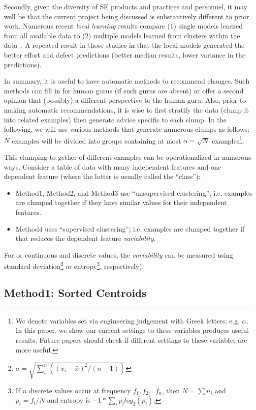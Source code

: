 \documentclass{sig-alternate}
\newcommand{\bi}{\begin{itemize}}
\newcommand{\ei}{\end{itemize}}
\begin{document}
Secondly, given the diversity of SE products and practices
and personnel, it may well be that the current project being discussed is 
substantively different to prior work. 
Numerous recent {\em local learning} results compare (1) single models
learned from all available data to (2) multiple models learned from clusters within the data~\cite{betten14,yang11,yang13,minku13,me12d,me11m,posnett11}.
A repeated result in those studies in that the local models generated the better effort
and defect predictions (better median results,
lower variance in the predictions).

In summary, 
it is useful to have automatic methods to recommend changes. Such
methods can fill in for human gurus (if such gurus are absent) or 
offer a second opinion that (possibly)  a different perspective to the human guru.
Also, prior to making automatic recommendations, it is wise to first stratify the data
(clump it into related examples) then generate advice specific to each clump.
In the following, we will use various methods that generate numerous clumps as follows:
  $N$ examples will be divided into groups containing at most $\alpha=\sqrt{N}$
  examples\footnote{We denote variables
  set via  engineering judgement  with Greek letters; e.g. $\alpha$.
  In this paper, we show our current settings to these variables produces useful
  results.  Future papers should check if different
  settings to these variables are more useful.}.
 
 This clumping to gether of different examples  can be operationalized in numerous ways. Consider  a table of data
with many independent features and one dependent feature (where the latter is usually called
the ``class''):
\bi
\item
Method1, Method2, and Method3
use ``unsupervised clustering''; i.e. examples are clumped together if they have
similar values for their independent features. 
\item
Method4 uses ``supervised clustering'';
i.e. examples are clumped together if that  reduces the dependent feature {\em variability}.
\ei
For or continuous and discrete values,
the {\em variability} can be measured using standard deviation\footnote{$\sigma = \sqrt{\sum^n_i \left( (x_i - \bar{x})^2/(n-1)\right)}$} or entropy\footnote{If $n$ discrete values occur at frequency
$f_1,f_2,.. f_n$, then \mbox{$N = \sum n_i$} and $p_i = f_i/N$ and entropy is 
$-1 * \sum_i p_ilog_2(p_i)$.}, respectively).  
\subsection{Method1: Sorted Centroids}
\end{document}
